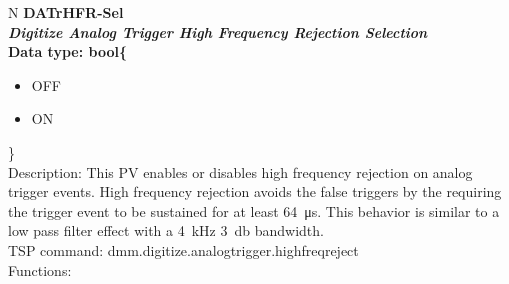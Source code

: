 \documentclass[openany]{article}
\begin{document}
		\begin{tabular}{N}
			\hline
			\bfseries DATrHFR-Sel\label{pv:datrhfr-sel} \\ \hline
			\emph{Digitize Analog Trigger High Frequency Rejection Selection} \\
			Data type: bool\{\begin{itemize}[noitemsep]
				\small
				\item[] OFF
				\item[] ON
			\end{itemize}\} \\
			Description: This PV enables or disables high frequency rejection on analog trigger events. High frequency rejection avoids the false triggers by the requiring the trigger event to be sustained for at least \SI{64}{\micro\second}. This behavior is similar to a low pass filter effect with a \SI{4}{\kilo\hertz} \SI{3}{\decibel} bandwidth. \\
			TSP command: dmm.digitize.analogtrigger.highfreqreject \\
			Functions: \\
			\arrayrulecolor{\FuncTableBorderColor}

		\end{tabular}
\end{document}
